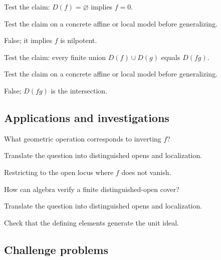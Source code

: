 \begin{exercise}\label{exr:vi08-expand-11}
Test the claim: $D(f)=\varnothing$ implies $f=0$.
\end{exercise}
\begin{hint}
Test the claim on a concrete affine or local model before generalizing.
\end{hint}
\begin{solution}
False; it implies $f$ is nilpotent.
\end{solution}

\begin{exercise}\label{exr:vi08-expand-12}
Test the claim: every finite union $D(f)\cup D(g)$ equals $D(fg)$.
\end{exercise}
\begin{hint}
Test the claim on a concrete affine or local model before generalizing.
\end{hint}
\begin{solution}
False; $D(fg)$ is the intersection.
\end{solution}

\subsection*{Applications and investigations}

\begin{exercise}\label{exr:vi08-expand-13}
What geometric operation corresponds to inverting $f$?
\end{exercise}
\begin{hint}
Translate the question into distinguished opens and localization.
\end{hint}
\begin{solution}
Restricting to the open locus where $f$ does not vanish.
\end{solution}

\begin{exercise}\label{exr:vi08-expand-14}
How can algebra verify a finite distinguished-open cover?
\end{exercise}
\begin{hint}
Translate the question into distinguished opens and localization.
\end{hint}
\begin{solution}
Check that the defining elements generate the unit ideal.
\end{solution}

\subsection*{Challenge problems}

